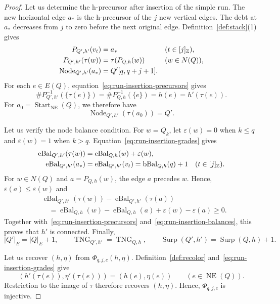 \begin{proof}
Let us determine the h-precursor after insertion of the simple run.
The new horizontal edge $a_*$ is the h-precursor of the $j$ new vertical edges.
The debt at $a_*$ decreases from $j$ to zero before the next original edge.
Definition~\ref{def:stack}(1) gives
\begin{equation}\label{eq:run-insertion-precursors}
\begin{aligned}
 P_{Q',h'}(v_t)&=a_*&&(t\in[j]_{\mathbb Z}),\\
 P_{Q',h'}(\tau(w))&=\tau(P_{Q,h}(w))&&(w\in N(Q)),\\
 \operatorname{Node}_{Q',h'}(a_*)&=Q'[q,q+j+1].
\end{aligned}
\end{equation}
For each $e\in E(Q)$, equation~\eqref{eq:run-insertion-precursors} gives
\[
 \#P_{Q',h'}^{-1}(\{\tau(e)\})=\#P_{Q,h}^{-1}(\{e\})=h(e)=h'(\tau(e)).
\]
For $a_0=\operatorname{Start}_{\mathrm{NE}}(Q)$, we therefore have
\[
 \operatorname{Node}_{Q',h'}(\tau(a_0))=Q'.
\]

Let us verify the node balance condition.
For $w=Q_k$, let $\varepsilon(w)=0$ when $k\le q$ and $\varepsilon(w)=1$ when $k>q$.
Equation~\eqref{eq:run-insertion-grades} gives
\begin{equation}\label{eq:run-insertion-balances}
\begin{aligned}
 \operatorname{eBal}_{Q',h'}(\tau(w))&=\operatorname{eBal}_{Q,h}(w)+\varepsilon(w),\\
 \operatorname{eBal}_{Q',h'}(a_*)&=\operatorname{eBal}_{Q',h'}(v_t)
 =\operatorname{bBal}_{Q,h}(q)+1\quad(t\in[j]_{\mathbb Z}).
\end{aligned}
\end{equation}
For $w\in N(Q)$ and $a=P_{Q,h}(w)$, the edge $a$ precedes $w$.
Hence, $\varepsilon(a)\le\varepsilon(w)$ and
\[
\begin{aligned}
 &\operatorname{eBal}_{Q',h'}(\tau(w))-\operatorname{eBal}_{Q',h'}(\tau(a))\\
 &\quad=\operatorname{eBal}_{Q,h}(w)-\operatorname{eBal}_{Q,h}(a)
       +\varepsilon(w)-\varepsilon(a)\ge0.
\end{aligned}
\]
Together with~\eqref{eq:run-insertion-precursors} and~\eqref{eq:run-insertion-balances}, this proves that $h'$ is connected.
Finally,
\begin{equation}\label{eq:run-insertion-surplus}
 |Q'|_E=|Q|_E+1,\qquad
 \operatorname{TNG}_{Q',h'}=\operatorname{TNG}_{Q,h},\qquad
 \operatorname{Surp}(Q',h')=\operatorname{Surp}(Q,h)+1.
\end{equation}

Let us recover $(h,\eta)$ from $\Phi_{q,j,c}(h,\eta)$.
Definition~\ref{def:recolor} and~\eqref{eq:run-insertion-grades} give
\[
 (h'(\tau(e)),\eta'(\tau(e)))=(h(e),\eta(e))
 \qquad(e\in\operatorname{NE}(Q)).
\]
Restriction to the image of $\tau$ therefore recovers $(h,\eta)$.
Hence, $\Phi_{q,j,c}$ is injective.
\end{proof}

